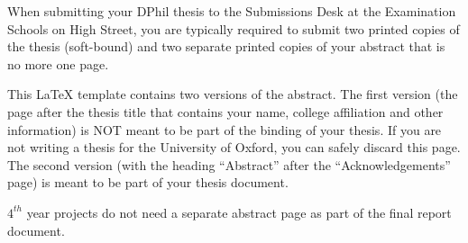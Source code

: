 

When submitting your DPhil thesis to the Submissions Desk at the Examination
Schools on High Street, you are typically required to submit two printed copies
of the thesis (soft-bound) and two separate printed copies of your abstract
that is no more one page. 

This LaTeX template contains two versions of the abstract. The 
first version (the page after the thesis title that contains your name, college 
affiliation and other information) is NOT meant to be part of the binding
of your thesis. If you are not writing a thesis for the University of Oxford, 
you can safely discard this page. The second version (with the heading 
``Abstract'' after the ``Acknowledgements'' page) is meant to be part of your
thesis document.

$4^{th}$ year projects do not need a separate abstract page as part of the final
report document.


